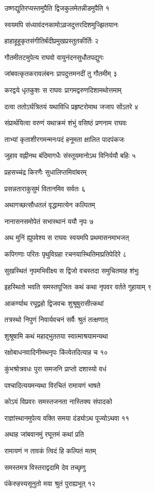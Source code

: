 उष्णद्युतिरप्यस्तमुपैति द्विजकुलमेतन्नीडमुपैति १

स्वयमपि संध्यावंदनकामोऽव्रजदुत्तरदिशमुज्झितयानः

हाहाहूहूकृतसंगीतिर्बंदीप्रमुखप्रस्तुतकीर्तिः २

गौतमीतटमुपेत्य राघवो वायुनंदनसुधौतपद्युगः

जांबवत्कृतकरावलंबनः प्रापदुत्तमनदीं तु गौतमीम् ३

करद्वये धृतकुशः स राघवः प्रागमद्वरुणदिशामथोत्तमाम्

दत्वा ततोऽर्घत्रितयं यथाविधि प्रहृष्टरोमाथ जजाप सोंऽतरे ४

संप्रार्थयित्वा वरुणं यथाक्रमं शंभुं वसिष्ठं प्रणनाम राघवः

ताभ्यां कृताशीरगमन्मनःपदं हनूमता क्षालित पादपंकजः

जुहाव वह्नीनथ बंदिमागधैः संस्तूयमानोऽथ विनिर्ययौ बहिः ५

प्रहसच्चंद्र किरणैः सुधालिप्तमिवांबरम्

प्रसन्नताराकुसुमं वितानमिव सर्वतः ६

अथागच्छत्सौधतलं वृद्धामात्येन कल्पितम्

नानासनसमोपेतं सभास्थानं ययौ नृपः ७

अथ मुनिं ह्युपवेश्य स राघवः स्वयमपि प्रथमासनमाभजत्

कपिगणाः परितः पृथुविग्रहा रचनयास्थितिमाप्रतिपेदिरे ८

सुखस्थितं नृपमभिवीक्ष्य स द्विजो वचस्तदा समुचितमाह शंभुः

इहस्थितो भवति समस्तपूजितः कथं कथा नृपवर वर्तते गुहायाम् ९

आकर्ण्याथ रघूद्वहो द्विजवचः शुश्रूषुरासीत्कथां

तत्रस्थो निपुणं निवार्यवचनं सर्वैः श्रुतं तत्क्षणात्

शुश्रूषामि कथं महाद्भुततया स्वात्माश्रयामन्यथा

रक्षोबाधनवादिनीमथनृपः किंत्वेतदित्याह च १०

कुंभश्रोत्रवधः पुरा समजनि प्राप्तो दशास्यो वधं

पश्चादित्ययमन्यथा विरचितं रामायणं भाषते

कोऽयं विप्रवरः समस्तजनता नास्तिक्य संपादको

राज्ञांस्थानमुपेत्य वक्ति समया दंड्योऽथ पूज्योऽथवा ११

अथाह जांबवानमुं रघूत्तमं कथां प्रति

रामायणं न तावकं त्विदं हि कल्पितं मतम्

समस्तमत्र विस्तराद्वदामि देव तच्छृणु

पंकेरुहस्यसूनुतो मया श्रुतं पुराह्यभूत् १२

